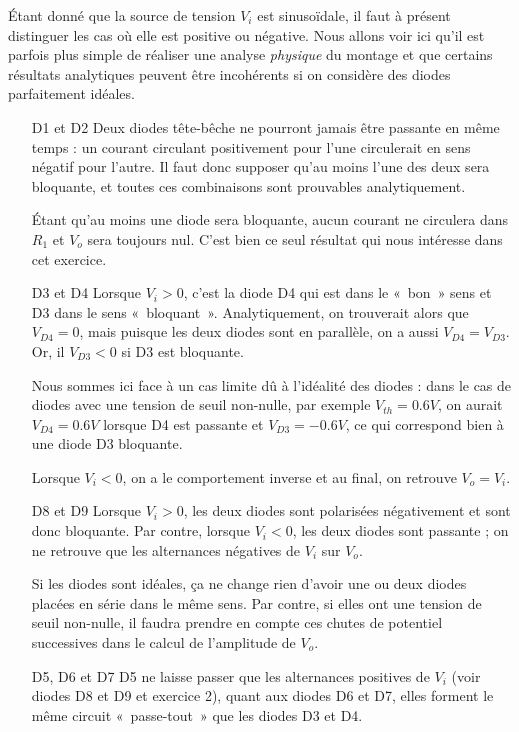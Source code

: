 \documentclass{../template/tp}
\begin{document}
{%
Étant donné que la source de tension $V_i$ est sinusoïdale, il faut à présent distinguer les cas où elle est positive ou négative.
Nous allons voir ici qu'il est parfois plus simple de réaliser une analyse \textit{physique} du montage et que certains résultats analytiques peuvent être incohérents si on considère des diodes parfaitement idéales.
\begin{itemize}
    \item[D1 et D2]
    Deux diodes tête-bêche ne pourront jamais être passante en même temps : un courant circulant positivement pour l'une circulerait en sens négatif pour l'autre.
    Il faut donc supposer qu'au moins l'une des deux sera bloquante, et toutes ces combinaisons sont prouvables analytiquement.
    
    Étant qu'au moins une diode sera bloquante, aucun courant ne circulera dans $R_1$ et $V_o$ sera toujours nul. C'est bien ce seul résultat qui nous intéresse dans cet exercice.

    \item[D3 et D4]
    Lorsque $V_i > 0$, c'est la diode D4 qui est dans le «~bon~» sens et D3 dans le sens «~bloquant~».
    Analytiquement, on trouverait alors que $V_{D4} = 0$, mais puisque les deux diodes sont en parallèle, on a aussi $V_{D4} = V_{D3}$. Or, il $V_{D3} < 0$ si D3 est bloquante.

    Nous sommes ici face à un cas limite dû à l'idéalité des diodes : dans le cas de diodes avec une tension de seuil non-nulle, par exemple $V_{th} = 0.6 V$, on aurait $V_{D4} = 0.6 V$ lorsque D4 est passante et $V_{D3} = -0.6V$, ce qui correspond bien à une diode D3 bloquante.

    Lorsque $V_i < 0$, on a le comportement inverse et au final, on retrouve $V_o = V_i$.

    \item[D8 et D9]
    Lorsque $V_i > 0$, les deux diodes sont polarisées négativement et sont donc bloquante.
    Par contre, lorsque $V_i < 0$, les deux diodes sont passante ; on ne retrouve que les alternances négatives de $V_i$ sur $V_o$.

    Si les diodes sont idéales, ça ne change rien d'avoir une ou deux diodes placées en série dans le même sens. Par contre, si elles ont une tension de seuil non-nulle, il faudra prendre en compte ces chutes de potentiel successives dans le calcul de l'amplitude de $V_o$.

    \item[D5, D6 et D7]
    D5 ne laisse passer que les alternances positives de $V_i$ (voir diodes D8 et D9 et exercice 2), quant aux diodes D6 et D7, elles forment le même circuit «~passe-tout~» que les diodes D3 et D4.
\end{itemize} 

}
\end{document}
